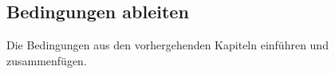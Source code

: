 \subsection{Bedingungen ableiten}

Die Bedingungen aus den vorhergehenden Kapiteln einführen und zusammenfügen.